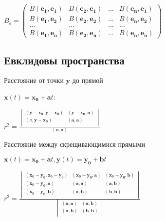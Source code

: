 $\displaystyle
B_\mathbb{e} = 
\begin{pmatrix}
	B(\boldsymbol{e_1},\boldsymbol{e_1})& B(\boldsymbol{e_2},\boldsymbol{e_1})& \ldots& B(\boldsymbol{e_n},\boldsymbol{e_1})\\
	B(\boldsymbol{e_1},\boldsymbol{e_2})& B(\boldsymbol{e_2},\boldsymbol{e_2})& \ldots& B(\boldsymbol{e_n},\boldsymbol{e_2})\\
	\ldots& \ldots& \ldots& \ldots\\
	B(\boldsymbol{e_1},\boldsymbol{e_n})& B(\boldsymbol{e_2},\boldsymbol{e_n})& \ldots& B(\boldsymbol{e_n},\boldsymbol{e_n})
\end{pmatrix}
$

\subsection{Евклидовы пространства}
 
Расстояние от точки $\boldsymbol{y}$ до прямой 

$\boldsymbol{x}(t) = \boldsymbol{x_0} + \boldsymbol{a}t$:

$\displaystyle r^2 = \frac{
	\begin{vmatrix} 
		(\boldsymbol{y}-\boldsymbol{x_0}, \boldsymbol{y}-\boldsymbol{x_0}) & (\boldsymbol{y}-\boldsymbol{x_0}, \boldsymbol{a}) \\
		(a, \boldsymbol{y}-\boldsymbol{x_0}) & (\boldsymbol{a}, \boldsymbol{a}) \\
	\end{vmatrix}
}{(\boldsymbol{a}, \boldsymbol{a})} $

Расстояние между скрещивающимися прямыми

$ \boldsymbol{x}(t) = \boldsymbol{x_0} + \boldsymbol{a}t, \boldsymbol{y}(t) = \boldsymbol{y_0} + \boldsymbol{b}t $

$\displaystyle r^2 = \frac{
	\begin{vmatrix} 
		(\boldsymbol{x_0}-\boldsymbol{y_0}, \boldsymbol{x_0}-\boldsymbol{y_0}) & (\boldsymbol{x_0}-\boldsymbol{y_0}, \boldsymbol{a}) & (\boldsymbol{x_0}-\boldsymbol{y_0}, \boldsymbol{b}) \\
		(\boldsymbol{x_0}-\boldsymbol{y_0}, \boldsymbol{a}) & (\boldsymbol{a}, \boldsymbol{a}) & (\boldsymbol{a}, \boldsymbol{b}) \\
		(\boldsymbol{x_0}-\boldsymbol{y_0}, \boldsymbol{b}) & (\boldsymbol{a}, \boldsymbol{b}) & (\boldsymbol{b}, \boldsymbol{b}) \\
	\end{vmatrix}
}{
	\begin{vmatrix} 
		(\boldsymbol{a}, \boldsymbol{a}) & (\boldsymbol{a}, \boldsymbol{b}) \\
		(\boldsymbol{a}, \boldsymbol{b}) & (\boldsymbol{b}, \boldsymbol{b}) \\
	\end{vmatrix}
} $

